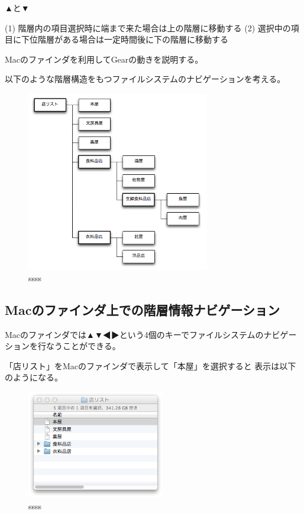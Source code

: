 \documentclass[twoside]{wiss}
\def\▲{▲}
\def\▼{▼}
\begin{document}
{\▲}と{\▼}

(1) 階層内の項目選択時に端まで来た場合は上の階層に移動する
(2) 選択中の項目に下位階層がある場合は一定時間後に下の階層に移動する

Macのファインダを利用してGearの動きを説明する。

以下のような階層構造をもつファイルシステムのナビゲーションを考える。

\begin{figure}[H]
\centerline{\includegraphics[width=80mm,bb=0 0 509 502]{figures/ae9216b00626f9c4eea44cc380f25886.png}}
\caption{ssss}
\label{screenshot}
\end{figure}

\subsection*{Macのファインダ上での階層情報ナビゲーション}

Macのファインダでは{\▲}{\▼}◀▶という4個のキーでファイルシステムのナビゲーションを行なうことができる。

「店リスト」をMacのファインダで表示して「本屋」を選択すると
表示は以下のようになる。

\begin{figure}[H]
\centerline{\includegraphics[width=60mm,bb=0 0 344 272]{figures/9b121bec45e5b480e5ac64fdd0f82592.png}}
\caption{ssss}
\label{screenshot}
\end{figure}
\end{document}
